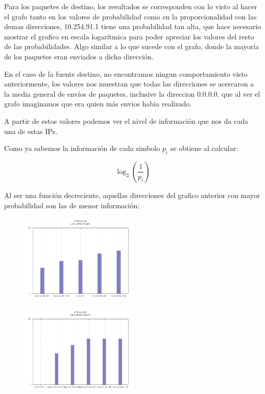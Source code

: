 	\par Para los paquetes de destino, los resultados se corresponden con lo visto al hacer el grafo tanto en los valores de probabilidad como en la proporcionalidad con las demas direcciones, 10.254.91.1 tiene una probabilidad tan alta, que hace necesario mostrar el grafico en escala logaritmica para poder apreciar los valores del resto de las probabilidades. Algo similar a lo que sucede con el grafo, donde la mayoría de los paquetes eran enviados a dicha dirección.
	\vspace{6 mm}

	\par En el caso de la fuente destino, no encontramos ningun comportamiento visto anteriormente, los valores nos muestran que todas las direcciones se acercaron a la media general de envíos de paquetes, inclusive la direccion 0.0.0.0, que al ver el grafo imaginamos que era quien más envios habia realizado. 


	\par A partir de estos valores podemos ver el nivel de información que nos da cada una de estas IPs.

	\par Como ya sabemos la información de cada simbolo $p_{i}$ se obtiene al calcular:

\begin{equation}
	\log_2 (\frac{1}{ p_{i} })
\end{equation}

	\par Al ser una función decreciente, aquellas direcciones del grafico anterior con mayor probabilidad son las de menor información:

\begin{figure}[!ht]
    \centering
    \includegraphics[width=0.5\textwidth]{img/graph/escenario_3/info_src.png}
\end{figure}


\begin{figure}[!ht]
    \centering
    \includegraphics[width=0.5\textwidth]{img/graph/escenario_3/info_dst.png}
\end{figure}


